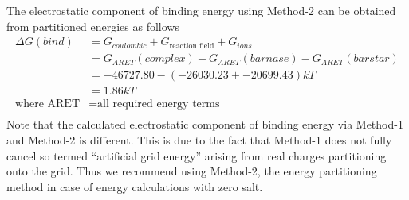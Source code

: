 \documentclass[9pt,tutorial]{livecoms}
\begin{document}
The electrostatic component of binding energy using Method-2 can be obtained from partitioned energies as follows
\begin{equation}
\begin{aligned}
\Delta G(bind) &= G_{coulombic} + G_{\text{reaction field}} + G_{ions}\\
               &= G_{ARET}(complex) - G_{ARET}(barnase) - G_{ARET}(barstar) \\
               &= -46727.80 - (-26030.23 + -20699.43) kT \\
               &= 1.86 kT \\
\text{where ARET} &= \text{all required energy terms} \\
\end{aligned}
\end{equation}            
Note that the calculated electrostatic component of binding energy via Method-1 and Method-2 is different. This is due to the fact that Method-1 does not fully cancel so termed “artificial grid energy” arising from real charges partitioning onto the grid. Thus we recommend using Method-2, the energy partitioning method in case of energy calculations with zero salt.
\end{document}
